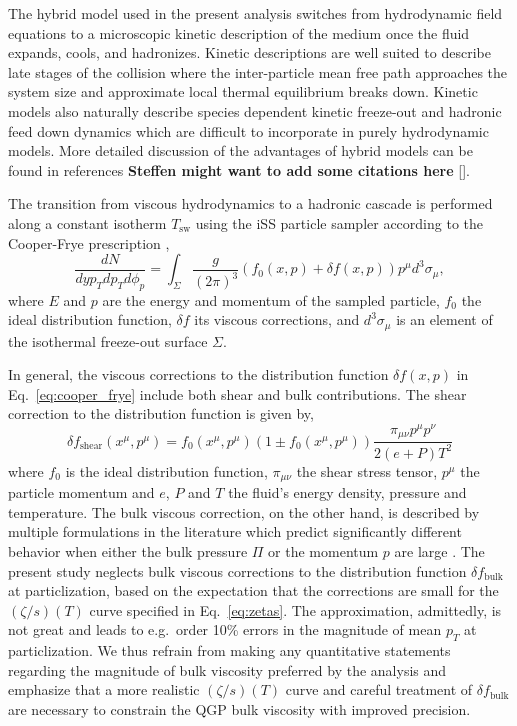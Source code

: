 \documentclass[aps,prc,reprint,amsmath,nofootinbib,superscriptaddress]{revtex4-1}
\begin{document}
The hybrid model used in the present analysis switches from hydrodynamic field equations to a microscopic kinetic description of the medium once the fluid expands, cools, and hadronizes.
Kinetic descriptions are well suited to describe late stages of the collision where the inter-particle mean free path approaches the system size and approximate local thermal equilibrium breaks down.
Kinetic models also naturally describe species dependent kinetic freeze-out and hadronic feed down dynamics which are difficult to incorporate in purely hydrodynamic models.
More detailed discussion of the advantages of hybrid models can be found in references {\bf Steffen might want to add some citations here} \ref{}.

The transition from viscous hydrodynamics to a hadronic cascade is performed along a constant isotherm $T_\text{sw}$ using the iSS particle sampler \cite{Shen:2014vra, Qiu:2013wca} according to the Cooper-Frye prescription \cite{Cooper:1974mv},
\begin{equation}
  \frac{dN}{dy p_T dp_T d\phi_p} =
    \int_\Sigma \frac{g}{(2\pi)^3} (f_0(x,p) + \delta f(x,p)) p^\mu d^3 \sigma_\mu,
  \label{eq:cooper_frye}
\end{equation}
where $E$ and $p$ are the energy and momentum of the sampled particle, $f_0$ the ideal distribution function, $\delta f$ its viscous corrections, and $d^3\sigma_\mu$ is an element of the isothermal freeze-out surface $\Sigma$.

In general, the viscous corrections to the distribution function $\delta f(x, p)$ in Eq.~\eqref{eq:cooper_frye} include both shear and bulk contributions.
The shear correction to the distribution function is given by,
\begin{equation}
  \delta f_\text{shear}(x^\mu, p^\mu) =
    f_0(x^\mu, p^\mu)(1 \pm f_0(x^\mu, p^\mu))
    \frac{\pi_{\mu\nu}p^\mu p^\nu}{2(e+P)T^2}
\end{equation}
where $f_0$ is the ideal distribution function, $\pi_{\mu\nu}$ the shear stress tensor, $p^\mu$ the particle momentum and $e$, $P$ and $T$ the fluid's energy density, pressure and temperature.
The bulk viscous correction, on the other hand, is described by multiple formulations in the literature which predict significantly different behavior when either the bulk pressure $\Pi$ or the momentum $p$ are large \cite{Dusling:2011fd, Noronha-Hostler:2013gga}.
The present study neglects bulk viscous corrections to the distribution function $\delta f_\text{bulk}$ at particlization, based on the expectation that the corrections are small for the $(\zeta/s)(T)$ curve specified in Eq.~\eqref{eq:zetas}.
The approximation, admittedly, is not great and leads to e.g.\ order 10\% errors in the magnitude of mean $p_T$ at particlization.
We thus refrain from making any quantitative statements regarding the magnitude of bulk viscosity preferred by the analysis and emphasize that a more realistic $(\zeta/s)(T)$ curve and careful treatment of $\delta f_\text{bulk}$ are necessary to constrain the QGP bulk viscosity with improved precision.
\end{document}
